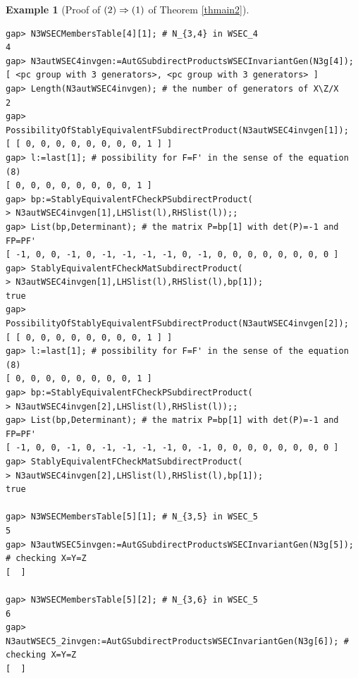 \documentclass{amsart}
\theoremstyle{plain}
\theoremstyle{definition}
\newtheorem{example}[theorem]{Example}
\theoremstyle{remark}
\begin{document}
\begin{example}[Proof of ${\rm (2)}\Rightarrow {\rm (1)}$ of {Theorem \ref{thmain2}}]
\begin{verbatim}
gap> N3WSECMembersTable[4][1]; # N_{3,4} in WSEC_4
4
gap> N3autWSEC4invgen:=AutGSubdirectProductsWSECInvariantGen(N3g[4]);
[ <pc group with 3 generators>, <pc group with 3 generators> ]
gap> Length(N3autWSEC4invgen); # the number of generators of X\Z/X
2
gap> PossibilityOfStablyEquivalentFSubdirectProduct(N3autWSEC4invgen[1]);
[ [ 0, 0, 0, 0, 0, 0, 0, 0, 1 ] ]
gap> l:=last[1]; # possibility for F=F' in the sense of the equation (8)
[ 0, 0, 0, 0, 0, 0, 0, 0, 1 ]
gap> bp:=StablyEquivalentFCheckPSubdirectProduct(
> N3autWSEC4invgen[1],LHSlist(l),RHSlist(l));;
gap> List(bp,Determinant); # the matrix P=bp[1] with det(P)=-1 and FP=PF'
[ -1, 0, 0, -1, 0, -1, -1, -1, -1, 0, -1, 0, 0, 0, 0, 0, 0, 0, 0 ]
gap> StablyEquivalentFCheckMatSubdirectProduct(
> N3autWSEC4invgen[1],LHSlist(l),RHSlist(l),bp[1]);
true
gap> PossibilityOfStablyEquivalentFSubdirectProduct(N3autWSEC4invgen[2]);
[ [ 0, 0, 0, 0, 0, 0, 0, 0, 1 ] ]
gap> l:=last[1]; # possibility for F=F' in the sense of the equation (8)
[ 0, 0, 0, 0, 0, 0, 0, 0, 1 ]
gap> bp:=StablyEquivalentFCheckPSubdirectProduct(
> N3autWSEC4invgen[2],LHSlist(l),RHSlist(l));;
gap> List(bp,Determinant); # the matrix P=bp[1] with det(P)=-1 and FP=PF' 
[ -1, 0, 0, -1, 0, -1, -1, -1, -1, 0, -1, 0, 0, 0, 0, 0, 0, 0, 0 ]
gap> StablyEquivalentFCheckMatSubdirectProduct(
> N3autWSEC4invgen[2],LHSlist(l),RHSlist(l),bp[1]);
true

gap> N3WSECMembersTable[5][1]; # N_{3,5} in WSEC_5
5
gap> N3autWSEC5invgen:=AutGSubdirectProductsWSECInvariantGen(N3g[5]); # checking X=Y=Z
[  ]

gap> N3WSECMembersTable[5][2]; # N_{3,6} in WSEC_5
6
gap> N3autWSEC5_2invgen:=AutGSubdirectProductsWSECInvariantGen(N3g[6]); # checking X=Y=Z
[  ]


\end{verbatim}
\end{example}
\end{document}
